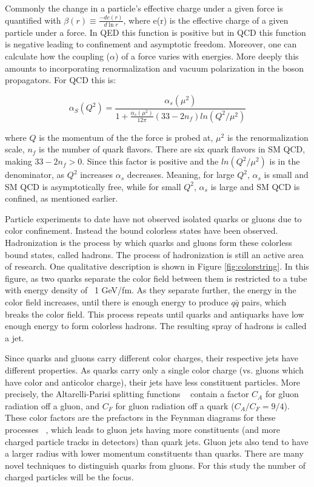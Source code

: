 Commonly the change in a particle's effective charge under a given force is quantified with  $\beta(r) \equiv \frac{-de(r)}{d\ln r}$, where e(r) is the effective charge of a given particle under a force. In QED this function is positive but in QCD this function is negative leading to confinement and asymptotic freedom. Moreover, one can calculate how the coupling ($\alpha$) of a force varies with energies. More deeply this amounts to incorporating renormalization and vacuum polarization in the boson propagators. For QCD this is:

\begin{equation}
\alpha_{S}(Q^{2}) = \frac{ \alpha_{s}(\mu^{2}) } { 1+ \frac{ \alpha_{s}( \mu^{2} ) } { 12\pi } ( 33-2n_{f} ) ln( Q^{2}/\mu^{2})}  
\end{equation}


where $Q$ is the momentum of the the force is probed at, $\mu^{2}$ is the renormalization scale, $n_{f}$ is the number of quark flavors. There are six quark flavors in SM QCD, making $33-2n_{f} > 0$. Since this factor is positive and the $ln(Q^{2}/\mu^{2})$ is in the denominator, as $Q^{2}$ increases $\alpha_{s}$ decreases. Meaning, for large $Q^{2}$, $\alpha_{s}$ is small and SM QCD is asymptotically free, while for small $Q^{2}$, $\alpha_{s}$ is large and SM QCD is confined, as mentioned earlier. 

Particle experiments to date have not observed isolated quarks or gluons due to color confinement. Instead the bound colorless states have been observed. Hadronization is the process by which quarks and gluons form these colorless bound states, called hadrons. The process of hadronization is still an active area of research. One qualitative description is shown in Figure \ref{fig:colorstring}. In this figure, as two quarks separate the color field between them is restricted to a tube with energy density of ~1 GeV/fm. As they separate further, the energy in the color field increases, until there is enough energy to produce $q\bar{q}$ pairs, which breaks the color field. This process repeats until quarks and antiquarks have low enough energy to form colorless hadrons. The resulting spray of hadrons is called a jet.

Since quarks and gluons carry different color charges, their respective jets have different properties. As quarks carry only a single color charge (vs. gluons which have color and anticolor charge), their jets have less constituent particles. More precisely, the Altarelli-Parisi splitting functions ~\cite{altarelli} contain a factor $C_{A}$ for gluon radiation off a gluon, and $C_{F}$ for gluon radiation off a quark ($C_{A}/C_{F} = 9/4$). These color factors are the prefactors in the Feynman diagrams for these processes ~\cite{colorfactor}, which leads to gluon jets having more constituents (and more charged particle tracks in detectors) than quark jets. Gluon jets also tend to have a larger radius with lower momentum constituents than quarks. There are many novel techniques to distinguish quarks from gluons. For this study the number of charged particles will be the focus.  

